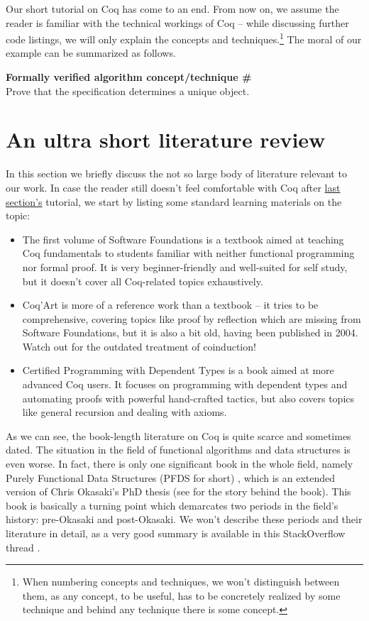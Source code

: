 \documentclass[declaration,mgr,english,shortabstract]{iithesis}
\newcounter{cnt}
\newcommand{\runcnt}{\#\arabic{cnt}}
\newcommand{\concept}[1]
{
    \refstepcounter{cnt}
    \begin{center}
        \textbf{Formally verified algorithm concept/technique \runcnt} \\
        #1
    \end{center}
}
\begin{document}
Our short tutorial on Coq has come to an end. From now on, we assume the reader is familiar with the technical workings of Coq -- while discussing further code listings, we will only explain the concepts and techniques.\footnote{When numbering concepts and techniques, we won't distinguish between them, as any concept, to be useful, has to be concretely realized by some technique and behind any technique there is some concept.} The moral of our example can be summarized as follows.

\concept{Prove that the specification determines a unique object.}

\section{An ultra short literature review} \label{literature}

In this section we briefly discuss the not so large body of literature relevant to our work. In case the reader still doesn't feel comfortable with Coq after \hyperref[coq]{last section's} tutorial, we start by listing some standard learning materials on the topic:

\begin{itemize}
    \item The first volume of Software Foundations \cite{SoftwareFoundations} is a textbook aimed at teaching Coq fundamentals to students familiar with neither functional programming nor formal proof. It is very beginner-friendly and well-suited for self study, but it doesn't cover all Coq-related topics exhaustively.
    \item Coq'Art \cite{CoqArt} is more of a reference work than a textbook -- it tries to be comprehensive, covering topics like proof by reflection which are missing from Software Foundations, but it is also a bit old, having been published in 2004. Watch out for the outdated treatment of coinduction!
    \item Certified Programming with Dependent Types \cite{CPDT} is a book aimed at more advanced Coq users. It focuses on programming with dependent types and automating proofs with powerful hand-crafted tactics, but also covers topics like general recursion and dealing with axioms.
\end{itemize}

As we can see, the book-length literature on Coq is quite scarce and sometimes dated. The situation in the field of functional algorithms and data structures is even worse. In fact, there is only one significant book in the whole field, namely Purely Functional Data Structures (PFDS for short) \cite{Okasaki}, which is an extended version of Chris Okasaki's PhD thesis \cite{OkasakiPhD} (see \cite{Okasaki10YearsLater} for the story behind the book). This book is basically a turning point which demarcates two periods in the field's history: pre-Okasaki and post-Okasaki. We won't describe these periods and their literature in detail, as a very good summary is available in this StackOverflow thread \cite{SinceOkasaki}.
\end{document}
